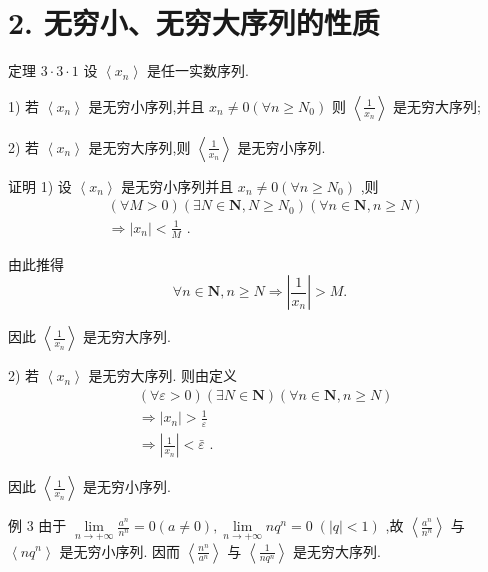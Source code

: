 \section*{2. 无穷小、无穷大序列的性质}

定理 $3 \cdot  3 \cdot  1$ 设 $\left\langle  {x}_{n}\right\rangle$ 是任一实数序列.

1) 若 $\left\langle  {x}_{n}\right\rangle$ 是无穷小序列,并且 ${x}_{n} \neq  0\left( {\forall n \geq  {N}_{0}}\right)$ 则 $\left\langle  \frac{1}{{x}_{n}}\right\rangle$ 是无穷大序列;

2) 若 $\left\langle  {x}_{n}\right\rangle$ 是无穷大序列,则 $\left\langle  \frac{1}{{x}_{n}}\right\rangle$ 是无穷小序列.

证明 1) 设 $\left\langle  {x}_{n}\right\rangle$ 是无穷小序列并且 ${x}_{n} \neq  0\left( {\forall n \geq  {N}_{0}}\right)$ ,则
\begin{align*}
	&\left( {\forall M > 0}\right) \left( {\exists N \in  \mathbf{N},N \geq  {N}_{0}}\right) \left( {\forall n \in  \mathbf{N},n \geq  N}\right)\\
	&\Rightarrow  \left| {x}_{n}\right|  < \frac{1}{M}\text{ . }
\end{align*}

由此推得
$$\forall n \in  \mathbf{N},n \geq  N \Rightarrow  \left| \frac{1}{{x}_{n}}\right|  > M.$$

因此 $\left\langle  \frac{1}{{x}_{n}}\right\rangle$ 是无穷大序列.

2) 若 $\left\langle  {x}_{n}\right\rangle$ 是无穷大序列. 则由定义
\begin{align*}
	&\left( {\forall \varepsilon  > 0}\right) \left( {\exists N \in  \mathbf{N}}\right) \left( {\forall n \in  \mathbf{N},n \geq  N}\right)\\
	&\Rightarrow  \left| {x}_{n}\right|  > \frac{1}{\varepsilon }\\
	&\Rightarrow  \left| \frac{1}{{x}_{n}}\right|  < \bar{\varepsilon }\text{ . }
\end{align*}

因此 $\left\langle  \frac{1}{{x}_{n}}\right\rangle$ 是无穷小序列.

例 3 由于 $\mathop{\lim }\limits_{{n \rightarrow   + \infty }}\frac{{a}^{n}}{{n}^{n}} = 0\left( {a \neq  0}\right) ,\mathop{\lim }\limits_{{n \rightarrow   + \infty }}n{q}^{n} = 0\;\left( {\left| q\right|  < 1}\right)$ ,故 $\left\langle  \frac{{a}^{n}}{{n}^{n}}\right\rangle$ 与 $\left\langle  {n{q}^{n}}\right\rangle$ 是无穷小序列. 因而 $\left\langle  \frac{{n}^{n}}{{a}^{n}}\right\rangle$ 与 $\left\langle  \frac{1}{n{q}^{n}}\right\rangle$ 是无穷大序列.

